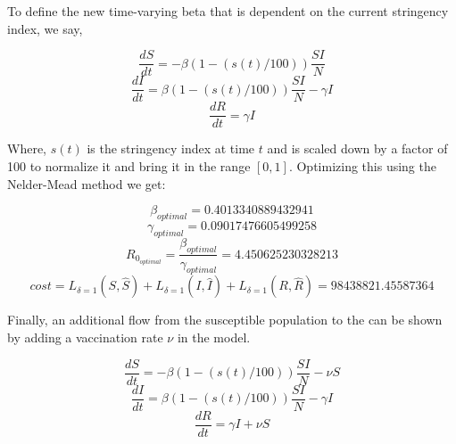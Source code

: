 \documentclass[tikz,fleqn,12pt]{wlscirep}
\begin{document}
To define the new time-varying beta that is dependent on the current stringency index, we say, 

\begin{equation}
  \frac{dS}{dt} = -\beta (1 - (s(t)/100)) \frac{S I}{N}
  \label{eq:S_with_lockdown}
\end{equation}
\begin{equation}
  \frac{dI}{dt} = \beta (1 - (s(t)/100)) \frac{S I}{N} - \gamma I
  \label{eq:I_with_lockdown}
\end{equation}
\begin{equation}
  \frac{dR}{dt} = \gamma I
  \label{eq:R_with_lockdown}
\end{equation}

Where, $s(t)$ is the stringency index at time $t$ and is scaled down by a factor of 100 to normalize it and bring it in the range $[0, 1]$. Optimizing this using the Nelder-Mead method we get:

\begin{equation}
  \beta_{optimal} = 0.4013340889432941
  \label{eq:beta_optimal_with_lockdown}
\end{equation}
\begin{equation}
  \gamma_{optimal} = 0.09017476605499258
  \label{eq:gamma_optimal_with_lockdown}
\end{equation}
\begin{equation}
  R_{0_{optimal}} = \frac{\beta_{optimal}}{\gamma_{optimal}} = 4.450625230328213
  \label{eq:r0_with_lockdown}
\end{equation}
\begin{equation}
  cost = L_{\delta = 1}(S, \hat{S}) + L_{\delta = 1}(I, \hat{I}) + L_{\delta = 1}(R, \hat{R}) = 98438821.45587364
  \label{eq:cost_with_lockdown}
\end{equation}

Finally, an additional flow from the susceptible population to the can be shown by adding a vaccination rate $\nu$ in the model. 

\begin{equation}
  \frac{dS}{dt} = -\beta (1 - (s(t)/100)) \frac{S I}{N} - \nu S
  \label{eq:S_with_lockdown_and_nu}
\end{equation}
\begin{equation}
  \frac{dI}{dt} = \beta (1 - (s(t)/100)) \frac{S I}{N} - \gamma I
  \label{eq:I_with_lockdown_and_nu}
\end{equation}
\begin{equation}
  \frac{dR}{dt} = \gamma I + \nu S
  \label{eq:R_with_lockdown_and_nu}
\end{equation}
\end{document}
